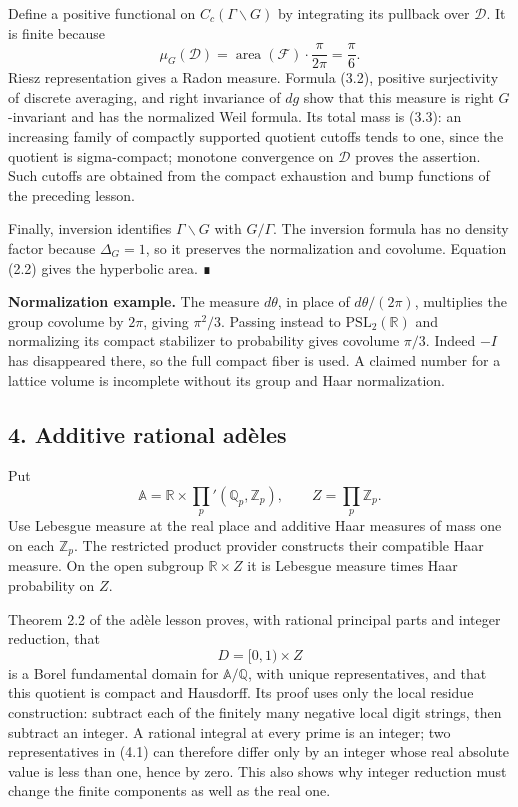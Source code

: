\documentclass[
  english,
  11pt,
  a4paper,
]{article}
\begin{document}
Define a positive functional on \(C_c(\Gamma\backslash G)\) by
integrating its pullback over \(\mathcal D\). It is finite because
\[\mu_G(\mathcal D)=\operatorname{area}(\mathcal F)\cdot\frac\pi{2\pi}=\frac\pi6.
\tag{3.3}\] Riesz representation gives a Radon measure. Formula (3.2),
positive surjectivity of discrete averaging, and right invariance of
\(dg\) show that this measure is right \(G\)-invariant and has the
normalized Weil formula. Its total mass is (3.3): an increasing family
of compactly supported quotient cutoffs tends to one, since the quotient
is sigma-compact; monotone convergence on \(\mathcal D\) proves the
assertion. Such cutoffs are obtained from the compact exhaustion and
bump functions of the preceding lesson.

Finally, inversion identifies \(\Gamma\backslash G\) with \(G/\Gamma\).
The inversion formula has no density factor because \(\Delta_G=1\), so
it preserves the normalization and covolume. Equation (2.2) gives the
hyperbolic area. ∎

\textbf{Normalization example.} The measure \(d\theta\), in place of
\(d\theta/(2\pi)\), multiplies the group covolume by \(2\pi\), giving
\(\pi^2/3\). Passing instead to \(\mathrm{PSL}_2(\mathbb R)\) and
normalizing its compact stabilizer to probability gives covolume
\(\pi/3\). Indeed \(-I\) has disappeared there, so the full compact
fiber is used. A claimed number for a lattice volume is incomplete
without its group and Haar normalization.

\subsection{4. Additive rational
adèles}\label{finite-covolume-and-arithmetic-quotients--4-additive-rational-aduxe8les}

Put \[\mathbb A=\mathbb R\times\prod_p'(\mathbb Q_p,\mathbb Z_p),
\qquad Z=\prod_p\mathbb Z_p.\] Use Lebesgue measure at the real place
and additive Haar measures of mass one on each \(\mathbb Z_p\). The
restricted product provider constructs their compatible Haar measure. On
the open subgroup \(\mathbb R\times Z\) it is Lebesgue measure times
Haar probability on \(Z\).

Theorem 2.2 of the adèle lesson proves, with rational principal parts
and integer reduction, that \[D=[0,1)\times Z
\tag{4.1}\] is a Borel fundamental domain for \(\mathbb A/\mathbb Q\),
with unique representatives, and that this quotient is compact and
Hausdorff. Its proof uses only the local residue construction: subtract
each of the finitely many negative local digit strings, then subtract an
integer. A rational integral at every prime is an integer; two
representatives in (4.1) can therefore differ only by an integer whose
real absolute value is less than one, hence by zero. This also shows why
integer reduction must change the finite components as well as the real
one.
\end{document}
